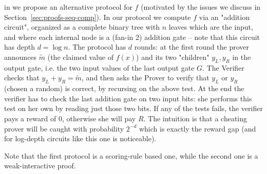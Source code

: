 in \cite{cg15} we propose an alternative protocol for $f$ (motivated by the issues we
discuss in Section~\ref{sec:proofs-seq-comp}). In our protocol we compute $f$ via an "addition circuit", organized as a complete binary tree with $n$ leaves which are the input, and where each internal node is a (fan-in 2) addition gate -- note that this circuit has depth $d=\log n$. The protocol has $d$ rounds: at the first round the prover announces $\tilde{m}$ (the claimed value of $f(x)$) and its two "children" $y_L,y_R$ in the output gate, i.e. the two input values of the last output gate $G$. The Verifier checks that 
$y_L +y_R=\tilde{m}$, and then asks the Prover to verify that $y_L$ or $y_R$ (chosen a random) is correct, by recursing on the above test. At the end the verifier has to check the last addition gate on two input bits: she performs this test on her own by reading just those two bits. If any of the tests fails, the verifier pays a reward of 0, otherwise she will pay $R$. The intuition is that a cheating prover will be caught with probability $2^{-d}$ which is exactly the reward gap (and for log-depth circuits like this one is noticeable). 

Note that the first protocol is a scoring-rule based one, while the second one is a weak-interactive proof. 


